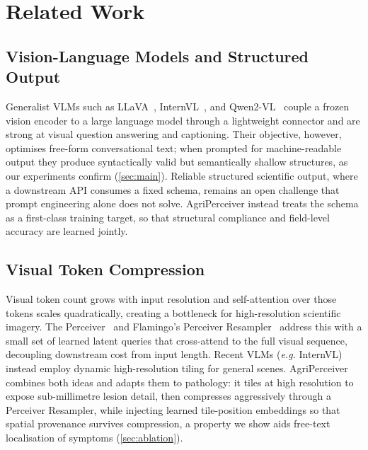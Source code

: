 \documentclass[runningheads]{llncs}
\newcommand{\ours}{AgriPerceiver}
\newcommand{\eg}{\textit{e.g.}}
\begin{document}
\section{Related Work}
\label{sec:related}

\subsection{Vision-Language Models and Structured Output}
Generalist VLMs such as LLaVA~\cite{liu2024visual}, InternVL~\cite{chen2024internvl}, and Qwen2-VL~\cite{wang2024qwen2vl} couple a frozen vision encoder to a large language model through a lightweight connector and are strong at visual question answering and captioning. Their objective, however, optimises free-form conversational text; when prompted for machine-readable output they produce syntactically valid but semantically shallow structures, as our experiments confirm (\cref{sec:main}). Reliable structured scientific output, where a downstream API consumes a fixed schema, remains an open challenge that prompt engineering alone does not solve. \ours{} instead treats the schema as a first-class training target, so that structural compliance and field-level accuracy are learned jointly.

\subsection{Visual Token Compression}
Visual token count grows with input resolution and self-attention over those tokens scales quadratically, creating a bottleneck for high-resolution scientific imagery. The Perceiver~\cite{jaegle2021perceiver} and Flamingo's Perceiver Resampler~\cite{alayrac2022flamingo} address this with a small set of learned latent queries that cross-attend to the full visual sequence, decoupling downstream cost from input length. Recent VLMs (\eg{} InternVL) instead employ dynamic high-resolution tiling for general scenes. \ours{} combines both ideas and adapts them to pathology: it tiles at high resolution to expose sub-millimetre lesion detail, then compresses aggressively through a Perceiver Resampler, while injecting learned tile-position embeddings so that spatial provenance survives compression, a property we show aids free-text localisation of symptoms (\cref{sec:ablation}).
\end{document}
